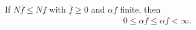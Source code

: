If $N\bar{f} \leq Nf$ with $\bar{f} \geq 0$ and $\alpha f$ finite, then
$$0 \leq \alpha \bar{f} \leq \alpha f < \infty.$$
